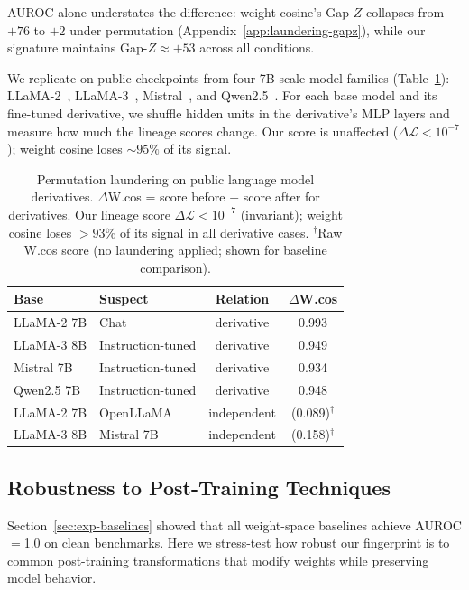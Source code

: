 AUROC alone understates the difference: weight cosine's Gap-$Z$ collapses from $+76$ to $+2$ under permutation (Appendix~\ref{app:laundering-gapz}), while our signature maintains Gap-$Z \approx +53$ across all conditions.

We replicate on public checkpoints from four 7B-scale model families (Table~\ref{tab:laundering-llm}): LLaMA-2~\citep{touvron2023llama}, LLaMA-3~\citep{grattafiori2024llama3}, Mistral~\citep{jiang2023mistral}, and Qwen2.5~\citep{yang2024qwen2}. For each base model and its fine-tuned derivative, we shuffle hidden units in the derivative's MLP layers and measure how much the lineage scores change. Our score is unaffected ($\Delta\mathcal{L} < 10^{-7}$); weight cosine loses ${\sim}95\%$ of its signal.

\begin{table}[t]
\centering
\small
\begin{tabular}{@{}llcc@{}}
\toprule
Base & Suspect & Relation & $\Delta$W.cos \\
\midrule
LLaMA-2 7B & Chat & derivative & 0.993 \\
LLaMA-3 8B & Instruction-tuned & derivative & 0.949 \\
Mistral 7B & Instruction-tuned & derivative & 0.934 \\
Qwen2.5 7B & Instruction-tuned & derivative & 0.948 \\
\midrule
LLaMA-2 7B & OpenLLaMA & independent & (0.089)$^\dagger$ \\
LLaMA-3 8B & Mistral 7B & independent & (0.158)$^\dagger$ \\
\bottomrule
\end{tabular}
\caption{Permutation laundering on public language model derivatives. $\Delta$W.cos = score before $-$ score after for derivatives. Our lineage score $\Delta\mathcal{L} < 10^{-7}$ (invariant); weight cosine loses ${>}93\%$ of its signal in all derivative cases. $^\dagger$Raw W.cos score (no laundering applied; shown for baseline comparison).}
\label{tab:laundering-llm}
\end{table}


\subsection{Robustness to Post-Training Techniques}\label{sec:exp-posttraining}

Section~\ref{sec:exp-baselines} showed that all weight-space baselines achieve AUROC$=$1.0 on clean benchmarks. Here we stress-test how robust our fingerprint is to common post-training transformations that modify weights while preserving model behavior.

